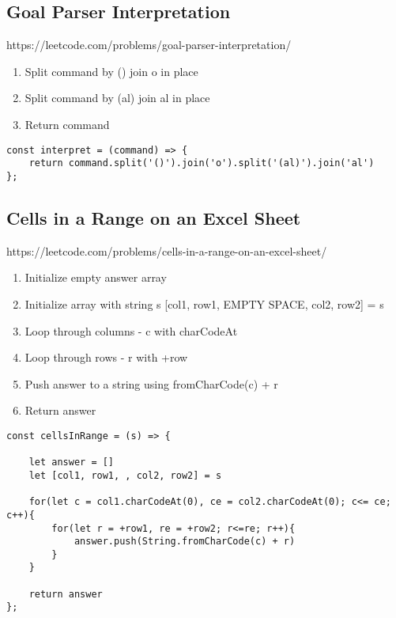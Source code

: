 \documentclass[10pt]{article}
\begin{document}
\pagebreak %
\medskip 
\subsection{Goal Parser Interpretation}
https://leetcode.com/problems/goal-parser-interpretation/

\begin{enumerate}
	\item Split command by () join o in place
	\item Split command by (al) join al in place
	\item Return command
\end{enumerate}

\begin{lstlisting}[title=Solution interpret, captionpos=t]
const interpret = (command) => {
    return command.split('()').join('o').split('(al)').join('al')
};
\end{lstlisting}
\medskip %




\pagebreak %
\medskip 
\subsection{Cells in a Range on an Excel Sheet}
https://leetcode.com/problems/cells-in-a-range-on-an-excel-sheet/

\begin{enumerate}
	\item Initialize empty answer array
	\item Initialize array with string s [col1, row1, EMPTY SPACE, col2, row2] = s
	\item Loop through columns - c with charCodeAt
	\item Loop through rows - r with +row
	\item Push answer to a string using fromCharCode(c) + r
	\item Return answer
\end{enumerate}

\begin{lstlisting}[title=Solution cellsInRange, captionpos=t]
const cellsInRange = (s) => {

    let answer = []
    let [col1, row1, , col2, row2] = s
    
    for(let c = col1.charCodeAt(0), ce = col2.charCodeAt(0); c<= ce; c++){
        for(let r = +row1, re = +row2; r<=re; r++){
            answer.push(String.fromCharCode(c) + r)
        }
    }
    
    return answer
};
\end{lstlisting}
\medskip %
\end{document}
